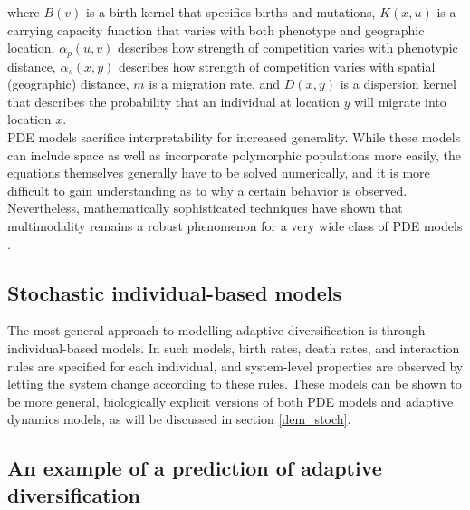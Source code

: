 where $B(v)$ is a birth kernel that specifies births and mutations, $K(x,u)$ is a carrying capacity function that varies with both phenotype and geographic location, $\alpha_p(u,v)$ describes how strength of competition varies with phenotypic distance, $\alpha_s(x,y)$ describes how strength of competition varies with spatial (geographic) distance, $m$ is a migration rate, and $D(x,y)$ is a dispersion kernel that describes the probability that an individual at location $y$ will migrate into location $x$.\\
PDE models sacrifice interpretability for increased generality. While these models can include space as well as incorporate polymorphic populations more easily, the equations themselves generally have to be solved numerically, and it is more difficult to gain understanding as to why a certain behavior is observed. Nevertheless, mathematically sophisticated techniques have shown that multimodality remains a robust phenomenon for a very wide class of PDE models \citep{elmhirst_pod_2008,doebeli_adaptive_2011}.

\subsection{Stochastic individual-based models}

The most general approach to modelling adaptive diversification is through individual-based models. In such models, birth rates, death rates, and interaction rules are specified for each individual, and system-level properties are observed by letting the system change according to these rules. These models can be shown to be more general, biologically explicit versions of both PDE models and adaptive dynamics models, as will be discussed in section \ref{dem_stoch}.

\subsection{An example of a prediction of adaptive diversification}

